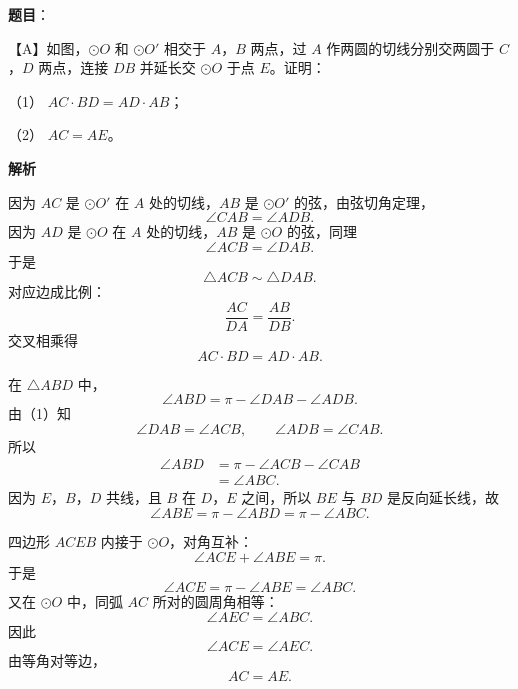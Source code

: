 \begin{answer}


\end{answer}
\begin{answer}

\textbf{题目}：

【A】如图，$\odot O$ 和 $\odot O'$ 相交于 $A$，$B$ 两点，过 $A$ 作两圆的切线分别交两圆于 $C$，$D$ 两点，连接 $DB$ 并延长交 $\odot O$ 于点 $E$。证明：
\nopagebreak[4]
\begin{center}\end{center}
\nopagebreak[4]
（1） $AC\cdot BD=AD\cdot AB$；

（2） $AC=AE$。

\textbf{解析}


因为 $AC$ 是 $\odot O'$ 在 $A$ 处的切线，$AB$ 是 $\odot O'$ 的弦，由弦切角定理，
\nopagebreak[4]
\[\angle CAB=\angle ADB.\]
因为 $AD$ 是 $\odot O$ 在 $A$ 处的切线，$AB$ 是 $\odot O$ 的弦，同理
\nopagebreak[4]
\[\angle ACB=\angle DAB.\]
于是
\nopagebreak[4]
\[\triangle ACB\sim\triangle DAB.\]
对应边成比例：
\nopagebreak[4]
\[\frac{AC}{DA}=\frac{AB}{DB}.\]
交叉相乘得
\nopagebreak[4]
\[AC\cdot BD=AD\cdot AB.\]


在 $\triangle ABD$ 中，
\nopagebreak[4]
\[\angle ABD=\pi-\angle DAB-\angle ADB.\]
由（1）知
\nopagebreak[4]
\[\angle DAB=\angle ACB,\qquad \angle ADB=\angle CAB.\]
所以
\nopagebreak[4]
\[\begin{aligned}
\angle ABD
&=\pi-\angle ACB-\angle CAB\\
&=\angle ABC.
\end{aligned}\]
因为 $E$，$B$，$D$ 共线，且 $B$ 在 $D$，$E$ 之间，所以 $BE$ 与 $BD$ 是反向延长线，故
\nopagebreak[4]
\[\angle ABE=\pi-\angle ABD=\pi-\angle ABC.\]

四边形 $ACEB$ 内接于 $\odot O$，对角互补：
\nopagebreak[4]
\[\angle ACE+\angle ABE=\pi.\]
于是
\nopagebreak[4]
\[\angle ACE=\pi-\angle ABE=\angle ABC.\]
又在 $\odot O$ 中，同弧 $AC$ 所对的圆周角相等：
\nopagebreak[4]
\[\angle AEC=\angle ABC.\]
因此
\nopagebreak[4]
\[\angle ACE=\angle AEC.\]
由等角对等边，
\nopagebreak[4]
\[AC=AE.\]



\end{answer}
